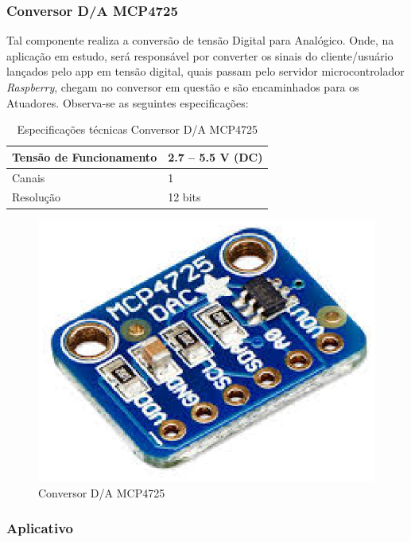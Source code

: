 \subsubsection{Conversor D/A MCP4725}

Tal componente realiza a conversão de tensão Digital para Analógico. Onde, na aplicação em estudo, será responsável por converter os sinais do cliente/usuário lançados pelo app em tensão digital, quais passam pelo servidor  microcontrolador \textit{Raspberry}, chegam no conversor em questão e são encaminhados para os Atuadores. Observa-se as seguintes especificações:\nocite{ds18b20}

\begin{table}[h]
\centering
\caption{Especificações técnicas Conversor D/A MCP4725}
\label{table5}
\begin{tabular}{|l|l|}
\hline
Tensão de Funcionamento & 2.7 – 5.5 V (DC) \\ \hline
Canais                  & 1                \\ \hline
Resolução               & 12 bits          \\ \hline
\end{tabular}
\end{table}

\begin{figure}[h]
	\centering
	\includegraphics[keepaspectratio=true,scale=0.5]{figuras/sensor4.eps}
	\caption{Conversor D/A MCP4725}
	\label{sensor4}
\end{figure}

\subsubsection{Aplicativo}

